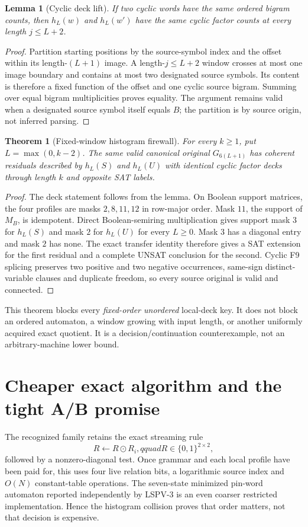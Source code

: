 \documentclass[11pt]{article}
\newtheorem{theorem}{Theorem}
\newtheorem{lemma}{Lemma}
\begin{document}
\begin{lemma}[Cyclic deck lift]
If two cyclic words have the same ordered bigram counts, then
$h_L(w)$ and $h_L(w')$ have the same cyclic factor counts at every length
$j\le L+2$.
\end{lemma}
\begin{proof}
Partition starting positions by the source-symbol index and the offset within its
length-$(L+1)$ image.  A length-$j\le L+2$ window crosses at most one image
boundary and contains at most two designated source symbols.  Its content is
therefore a fixed function of the offset and one cyclic source bigram.  Summing
over equal bigram multiplicities proves equality.  The argument remains valid
when a designated source symbol itself equals $B$; the partition is by source
origin, not inferred parsing.
\end{proof}

\begin{theorem}[Fixed-window histogram firewall]
For every $k\ge1$, put $L=\max(0,k-2)$.  The same valid canonical original
$G_{6(L+1)}$ has coherent residuals described by $h_L(S)$ and $h_L(U)$ with
identical cyclic factor decks through length $k$ and opposite SAT labels.
\end{theorem}
\begin{proof}
The deck statement follows from the lemma.  On Boolean support matrices, the four
profiles are masks $2,8,11,12$ in row-major order.  Mask $11$, the support of
$M_B$, is idempotent.  Direct Boolean-semiring multiplication gives support mask
$3$ for $h_L(S)$ and mask $2$ for $h_L(U)$ for every $L\ge0$.  Mask $3$ has a
diagonal entry and mask $2$ has none.  The exact transfer identity therefore
gives a SAT extension for the first residual and a complete UNSAT conclusion for
the second.  Cyclic F9 splicing preserves two positive and two negative
occurrences, same-sign distinct-variable clauses and duplicate freedom, so every
source original is valid and connected.
\end{proof}

This theorem blocks every \emph{fixed-order unordered} local-deck key.  It does not
block an ordered automaton, a window growing with input length, or another
uniformly acquired exact quotient.  It is a decision/continuation counterexample,
not an arbitrary-machine lower bound.

\section{Cheaper exact algorithm and the tight A/B promise}
The recognized family retains the exact streaming rule
\[
R\leftarrow R\odot R_i,qquad R\in\{0,1\}^{2\times2},
\]
followed by a nonzero-diagonal test.  Once grammar and each local profile have
been paid for, this uses four live relation bits, a logarithmic source index and
$O(N)$ constant-table operations.  The seven-state minimized pin-word automaton
reported independently by LSPV-3 is an even coarser restricted implementation.
Hence the histogram collision proves that order matters, not that decision is
expensive.
\end{document}
